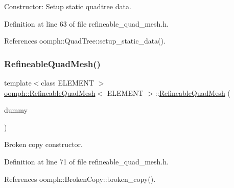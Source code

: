 Constructor\+: Setup static quadtree data. 



Definition at line 63 of file refineable\+\_\+quad\+\_\+mesh.\+h.



References oomph\+::\+Quad\+Tree\+::setup\+\_\+static\+\_\+data().

\mbox{\label{classoomph_1_1RefineableQuadMesh_a17e78defc7047b3ffa57feb3e0ff4488}} 
\subsubsection{\texorpdfstring{Refineable\+Quad\+Mesh()}{RefineableQuadMesh()}\hspace{0.1cm}{\footnotesize\ttfamily [2/2]}}
{\footnotesize\ttfamily template$<$class E\+L\+E\+M\+E\+NT $>$ \\
\hyperlink{classoomph_1_1RefineableQuadMesh}{oomph\+::\+Refineable\+Quad\+Mesh}$<$ E\+L\+E\+M\+E\+NT $>$\+::\hyperlink{classoomph_1_1RefineableQuadMesh}{Refineable\+Quad\+Mesh} (\begin{DoxyParamCaption}\item[{const \hyperlink{classoomph_1_1RefineableQuadMesh}{Refineable\+Quad\+Mesh}$<$ E\+L\+E\+M\+E\+NT $>$ \&}]{dummy }\end{DoxyParamCaption})\hspace{0.3cm}{\ttfamily [inline]}}



Broken copy constructor. 



Definition at line 71 of file refineable\+\_\+quad\+\_\+mesh.\+h.



References oomph\+::\+Broken\+Copy\+::broken\+\_\+copy().

\mbox{\label{classoomph_1_1RefineableQuadMesh_a597f1137fa2bd77cc0126a96eccaf97f}} 
